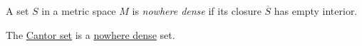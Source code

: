 \begin{definition}\label{def:nowhere-dense}
	A set \(S\) in a metric space \(M\) is \emph{nowhere dense} if its closure \(\overline{S}\) has empty interior.
\end{definition}

\begin{eg}
	The \href{https://en.wikipedia.org/wiki/Cantor_set}{Cantor set} is a \hyperref[def:nowhere-dense]{nowhere dense} set.
\end{eg}